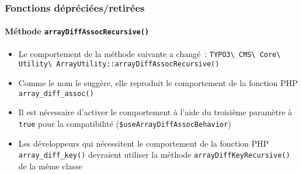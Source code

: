%

\begin{frame}[fragile]
	\frametitle{Fonctions dépréciées/retirées}
	\framesubtitle{Méthode \texttt{arrayDiffAssocRecursive()}}

	\begin{itemize}
		\item Le comportement de la méthode suivante a changé~:\newline
			\smaller\texttt{TYPO3\textbackslash
				CMS\textbackslash
				Core\textbackslash
				Utility\textbackslash
				ArrayUtility::arrayDiffAssocRecursive()}\normalsize
		\item Comme le nom le suggère, elle reproduit le comportement de la fonction PHP
			\texttt{array\_diff\_assoc()}
		\item Il est nécessaire d'activer le comportement à l'aide du troisième paramètre à
			\texttt{true} pour la compatibilité
			(\texttt{\$useArrayDiffAssocBehavior})
		\item Les développeurs qui nécessitent le comportement de la fonction PHP
			\texttt{array\_diff\_key()} devraient utiliser la méthode
			\texttt{arrayDiffKeyRecursive()} de la même classe
	\end{itemize}

\end{frame}

